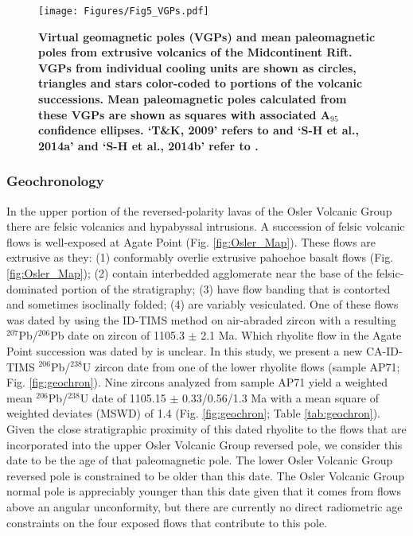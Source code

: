 \documentclass[11pt,letterpaper]{article}
\begin{document}
\begin{figure}
\centering
\texttt{[image: Figures/Fig5\_VGPs.pdf]}
\caption{\small{\textbf{Virtual geomagnetic poles (VGPs) and mean paleomagnetic poles from extrusive volcanics of the Midcontinent Rift. VGPs from individual cooling units are shown as circles, triangles and stars color-coded to portions of the volcanic successions. Mean paleomagnetic poles calculated from these VGPs are shown as squares with associated A$_{95}$ confidence ellipses. `T\&K, 2009' refers to \cite{Tauxe2009a} and `S-H et al., 2014a' and `S-H et al., 2014b' refer to \cite{Swanson-Hysell2014a, Swanson-Hysell2014b}.}}}
\label{fig:VGP}
\end{figure}

\subsubsection{Geochronology}

In the upper portion of the reversed-polarity lavas of the Osler Volcanic Group there are felsic volcanics and hypabyssal intrusions. A succession of felsic volcanic flows is well-exposed at Agate Point (Fig. \ref{fig:Osler_Map}). These flows are extrusive as they: (1) conformably overlie extrusive pahoehoe basalt flows (Fig. \ref{fig:Osler_Map}); (2) contain interbedded agglomerate near the base of the felsic-dominated portion of the stratigraphy; (3) have flow banding that is contorted and sometimes isoclinally folded; (4) are variably vesiculated. One of these flows was dated by \cite{Davis1997a} using the ID-TIMS method on air-abraded zircon with a resulting $^{\mathrm{207}}$Pb/$^{\mathrm{206}}$Pb date on zircon of 1105.3 $\pm$ 2.1 Ma. Which rhyolite flow in the Agate Point succession was dated by \cite{Davis1997a} is unclear. In this study, we present a new CA-ID-TIMS $^{\mathrm{206}}$Pb/$^{\mathrm{238}}$U zircon date from one of the lower rhyolite flows (sample AP71; Fig. \ref{fig:geochron}). Nine zircons analyzed from sample AP71 yield a weighted mean $^{\mathrm{206}}$Pb/$^{\mathrm{238}}$U date of 1105.15 $\pm$ 0.33/0.56/1.3 Ma with a mean square of weighted deviates (MSWD) of 1.4 (Fig. \ref{fig:geochron}; Table \ref{tab:geochron}). Given the close stratigraphic proximity of this dated rhyolite to the flows that are incorporated into the upper Osler Volcanic Group reversed pole, we consider this date to be the age of that paleomagnetic pole. The lower Osler Volcanic Group reversed pole is constrained to be older than this date. The Osler Volcanic Group normal pole is appreciably younger than this date given that it comes from flows above an angular unconformity, but there are currently no direct radiometric age constraints on the four exposed flows that contribute to this pole.
\end{document}
